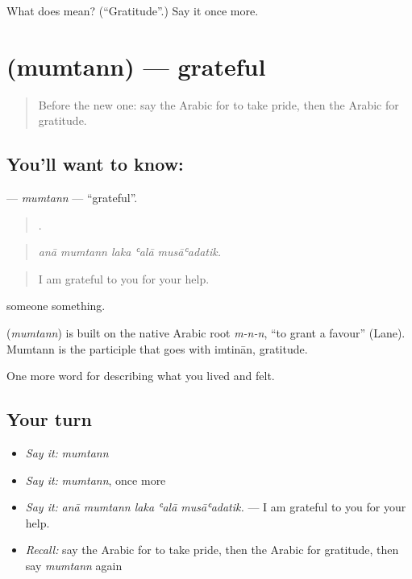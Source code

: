 \begin{tcolorbox}[breakable,colback=teal!4,colframe=teal!35!black,title={Before you move on}]
What does  mean? (\textquotedblleft{}Gratitude\textquotedblright{}.) Say it once more.
\end{tcolorbox}
\section[\texorpdfstring{\ar{ممتن} (mumtann)}{ممتن (mumtann)}]{ (mumtann) — grateful}

\label{lesson:AR-C491-mumtann}



\begin{quote}
Before the new one: say the Arabic for to take pride, then the Arabic for gratitude.
\end{quote}

\subsection*{You'll want to know: }
\textbf{} — \emph{mumtann} — \textquotedblleft{}grateful\textquotedblright{}.

\begin{quote}
    .
\end{quote}

\begin{quote}
\emph{anā mumtann laka ʿalā musāʿadatik.}
\end{quote}

\begin{quote}
I am grateful to you for your help.
\end{quote}

  someone  something.

\begin{cousinweb}
\textbf{} (\emph{mumtann}) is built on the native Arabic root \emph{m-n-n}, \textquotedblleft{}to grant a favour\textquotedblright{} (Lane). Mumtann is the participle that goes with imtinān, gratitude.
\end{cousinweb}

\begin{grammarlens}[title={What you've built}]
One more word for describing what you lived and felt.
\end{grammarlens}

\subsection*{Your turn}
\begin{itemize}
\raggedright
  \item \emph{Say it:} \emph{mumtann}
  \item \emph{Say it:} \emph{mumtann}, once more
  \item \emph{Say it:} \emph{anā mumtann laka ʿalā musāʿadatik.} — I am grateful to you for your help.
  \item \emph{Recall:} say the Arabic for to take pride, then the Arabic for gratitude, then say \emph{mumtann} again
\end{itemize}

